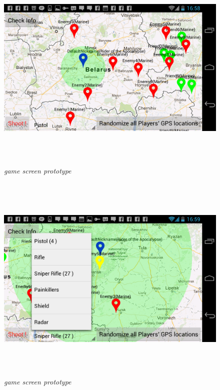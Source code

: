 \documentclass{article}
\begin{document}
\begin{figure}
\includegraphics[height=4in,width=7.12in]{./images/android_screenshots/ui_prototype/UI_prototype_3.png}  
\caption{\small \sl game screen prototype \label{fig:UIPrototype3}}
\end{figure}

\begin{figure}
\includegraphics[height=4in,width=7.12in]{./images/android_screenshots/ui_prototype/UI_prototype_4.png}  
\caption{\small \sl game screen prototype \label{fig:UIPrototype4}}
\end{figure}
\end{document}
